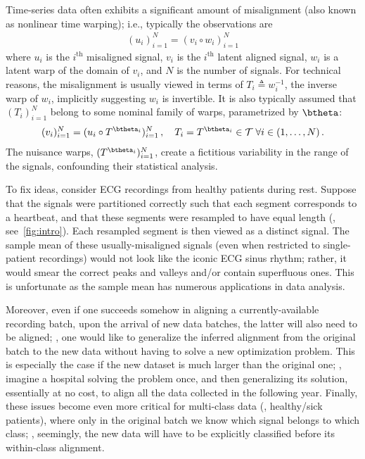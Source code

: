 

Time-series data often exhibits a significant amount of misalignment (also known as nonlinear time warping);
i.e., typically the observations are
\begin{align}\label{Eqn:MisalignedDataFwd}
  (u_i)_{i=1}^N = (v_i \circ w_i)_{i=1}^N 
\end{align}
where
$u_i$ is the $i^\mathrm{th}$ misaligned signal,
$v_i$ is the $i^\mathrm{th}$ latent aligned signal, 
$w_i$ is a latent warp of the domain of $v_i$, 
and $N$ is the number of signals.
%
For technical reasons, the misalignment is usually viewed 
in terms of $T_i \triangleq w_i^{-1}$, the inverse warp
of $w_i$, implicitly suggesting $w_i$ is invertible.
It is also typically assumed that 
$(T_i)_{i=1}^N$ belong to some nominal family of warps, parametrized by
$\btheta$:
 \begin{align}\label{Eqn:MisalignedDataInv}
 (v_i)_{i=1}^N = (u_i\circ {T^{\btheta_i}})_{i=1}^N  \,, \quad  T_i=T^{\btheta_i}\in\Tcal\; \forall i\in(1,\ldots,N)
\, .
\end{align}
The nuisance warps, $(T^{\btheta_i})_{i=1}^N$, 
create a fictitious variability in the range of the signals, 
confounding their statistical analysis. 

To fix ideas, consider ECG recordings from healthy patients during rest. Suppose that the signals
were partitioned correctly such that each segment corresponds to a heartbeat, and that these segments were resampled %
to have equal length (\eg, see~\autoref{fig:intro}). Each resampled segment is then 
viewed as a distinct signal.
The sample mean of these usually-misaligned signals (even when restricted to single-patient recordings) would not look like
the iconic
ECG sinus rhythm; rather, it would smear the correct peaks and valleys and/or contain superfluous ones. This is unfortunate as the sample mean 
has numerous applications in data analysis.  

Moreover, even if one succeeds somehow
in aligning a currently-available recording batch,
upon the arrival of new data batches, the latter will also need to be aligned; \ie, one would like to generalize the inferred alignment from the original batch to the new data
without having to solve a new optimization problem. This is especially the case if the new dataset is much larger than the original one; \eg, imagine a hospital solving the problem once,
and then generalizing its solution, essentially at no cost, to align all the data 
collected in the following year. 
Finally,
these issues become even more critical for multi-class data (\eg, healthy/sick patients), where only in the original batch
we know which signal belongs to which class; \ie, seemingly, the new data will have to be
explicitly classified before its within-class alignment. 


